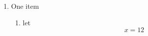 \begin{enumerate}
    \item One item \begin{enumerate}
        \item let \[x=12\]
    \end{enumerate}
\end{enumerate}